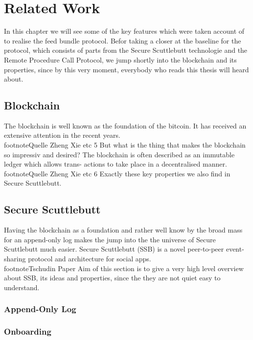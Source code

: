\chapter{Related Work}
In this chapter we will see some of the key features which were taken account of to realise the
feed bundle protocol. Befor taking a closer at the baseline for the protocol, which consists of
parts from the Secure Scuttlebutt technologie and the Remote Procedure Call Protocol, we
jump shortly into the blockchain and its properties, since by this very moment, everybody
who reads this thesis will heard about.
\section{Blockchain}
The blockchain is well known as the foundation of the bitcoin. It has received an extensive
attention in the recent years.\\footnote{Quelle Zheng Xie etc} 5 But what is the thing that makes the blockchain so impressiv
and desired? The blockchain is often described as an immutable ledger which allows trans-
actions to take place in a decentralised manner.\\footnote{Quelle Zheng Xie etc} 6 Exactly these key properties we also find
in Secure Scuttlebutt.
\section{Secure Scuttlebutt}
Having the blockchain as a foundation and rather well know by the broad mass for an
append-only log makes the jump into the the universe of Secure Scuttlebutt much easier.
Secure Scuttlebutt (SSB) is a novel peer-to-peer event-sharing protocol and architecture for
social apps.\\footnote{Tschudin Paper} Aim of this section is to give a very high level overview about SSB, its ideas
and properties, since the they are not quiet easy to understand.
\subsection{Append-Only Log}

\subsection{Onboarding}
